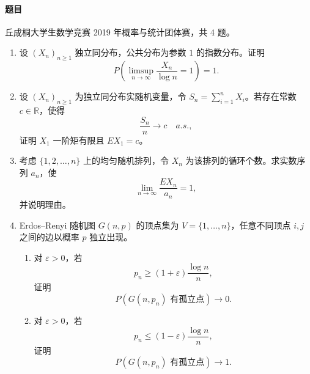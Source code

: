 \documentclass[UTF8,12pt]{ctexart}
\begin{document}
\paragraph{题目}
丘成桐大学生数学竞赛 2019 年概率与统计团体赛，共 4 题。
\begin{enumerate}[label=\textbf{\arabic*)},leftmargin=2.2em]
\item 设 \((X_n)_{n\ge1}\) 独立同分布，公共分布为参数 \(1\) 的指数分布。证明
\[
P\left(\limsup_{n\to\infty}\frac{X_n}{\log n}=1\right)=1.
\]

\item 设 \((X_n)_{n\ge1}\) 为独立同分布实随机变量，令 \(S_n=\sum_{i=1}^nX_i\)。若存在常数 \(c\in\mathbb R\)，使得
\[
\frac{S_n}{n}\to c\quad a.s.,
\]
证明 \(X_1\) 一阶矩有限且 \(E X_1=c\)。

\item 考虑 \(\{1,2,\ldots,n\}\) 上的均匀随机排列，令 \(X_n\) 为该排列的循环个数。求实数序列 \(a_n\)，使
\[
\lim_{n\to\infty}\frac{E X_n}{a_n}=1,
\]
并说明理由。

\item Erdos--Renyi 随机图 \(G(n,p)\) 的顶点集为 \(V=\{1,\ldots,n\}\)，任意不同顶点 \(i,j\) 之间的边以概率 \(p\) 独立出现。
\begin{enumerate}[label=\textbf{(\alph*)},leftmargin=2.4em]
\item 对 \(\varepsilon>0\)，若
\[
p_n\ge (1+\varepsilon)\frac{\log n}{n},
\]
证明
\[
P(G(n,p_n)\text{ 有孤立点})\to0.
\]
\item 对 \(\varepsilon>0\)，若
\[
p_n\le (1-\varepsilon)\frac{\log n}{n},
\]
证明
\[
P(G(n,p_n)\text{ 有孤立点})\to1.
\]
\end{enumerate}
\end{enumerate}
\end{document}
